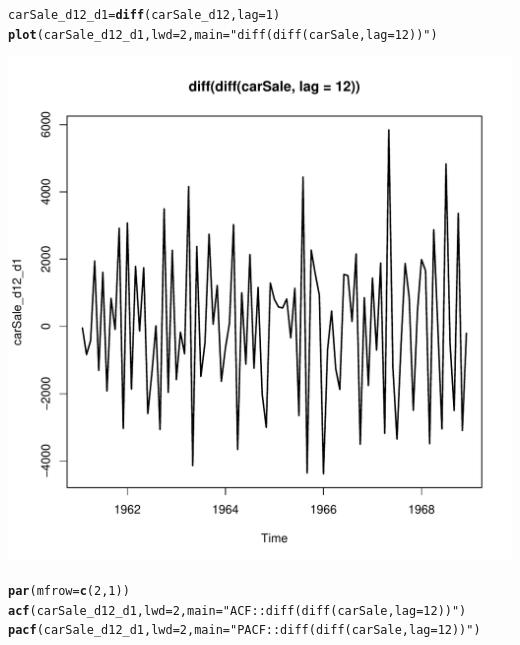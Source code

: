 \documentclass[10pt]{article}\usepackage[]{graphicx}\usepackage[]{color}
\makeatletter
\def\maxwidth{ %
  \ifdim\Gin@nat@width>\linewidth
    \linewidth
  \else
    \Gin@nat@width
  \fi
}
\newcommand{\hlnum}[1]{\textcolor[rgb]{0.686,0.059,0.569}{#1}}%
\newcommand{\hlstr}[1]{\textcolor[rgb]{0.192,0.494,0.8}{#1}}%
\newcommand{\hlstd}[1]{\textcolor[rgb]{0.345,0.345,0.345}{#1}}%
\newcommand{\hlkwb}[1]{\textcolor[rgb]{0.69,0.353,0.396}{#1}}%
\newcommand{\hlkwc}[1]{\textcolor[rgb]{0.333,0.667,0.333}{#1}}%
\newcommand{\hlkwd}[1]{\textcolor[rgb]{0.737,0.353,0.396}{\textbf{#1}}}%
\newenvironment{kframe}{%
 \def\at@end@of@kframe{}%
 \ifinner\ifhmode%
  \def\at@end@of@kframe{\end{minipage}}%
  \begin{minipage}{\columnwidth}%
 \fi\fi%
 \def\FrameCommand##1{\hskip\@totalleftmargin \hskip-\fboxsep
 \colorbox{shadecolor}{##1}\hskip-\fboxsep
     \hskip-\linewidth \hskip-\@totalleftmargin \hskip\columnwidth}%
 \MakeFramed {\advance\hsize-\width
   \@totalleftmargin\z@ \linewidth\hsize
   \@setminipage}}%
 {\par\unskip\endMakeFramed%
 \at@end@of@kframe}
\newenvironment{knitrout}{}{} %
\makeatother
\begin{document}
\begin{knitrout}
\begin{kframe}
\begin{alltt}
\hlstd{carSale_d12_d1} \hlkwb{=} \hlkwd{diff}\hlstd{(carSale_d12,} \hlkwc{lag} \hlstd{=} \hlnum{1}\hlstd{)}
\hlkwd{plot}\hlstd{(carSale_d12_d1,}\hlkwc{lwd} \hlstd{=} \hlnum{2}\hlstd{,} \hlkwc{main} \hlstd{=} \hlstr{"diff(diff(carSale, lag = 12))"}\hlstd{)}
\end{alltt}
\end{kframe}
\includegraphics[width=\maxwidth]{figure/unnamed-chunk-33-3} 
\begin{kframe}\begin{alltt}
\hlkwd{par}\hlstd{(}\hlkwc{mfrow}\hlstd{=}\hlkwd{c}\hlstd{(}\hlnum{2}\hlstd{,}\hlnum{1}\hlstd{))}
\hlkwd{acf}\hlstd{(carSale_d12_d1,}\hlkwc{lwd} \hlstd{=} \hlnum{2}\hlstd{,} \hlkwc{main} \hlstd{=} \hlstr{"ACF::diff(diff(carSale, lag = 12))"}\hlstd{)}
\hlkwd{pacf}\hlstd{(carSale_d12_d1,}\hlkwc{lwd} \hlstd{=} \hlnum{2}\hlstd{,} \hlkwc{main} \hlstd{=} \hlstr{"PACF::diff(diff(carSale, lag = 12))"}\hlstd{)}
\end{alltt}
\end{kframe}

\end{knitrout}
\end{document}
